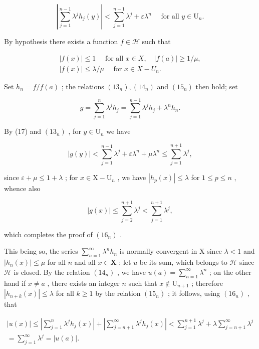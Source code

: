\[
\left| \sum_ {j = 1} ^ {n - 1} \lambda^ {j} h _ {j} (y) \right| <   \sum_ {j = 1} ^ {n - 1} \lambda^ {j} + \varepsilon \lambda^ {n} \quad \text { for   all } y \in \mathrm{U} _ {n}.\tag{17}
\]

By hypothesis there exists a function \(f \in \mathcal{H}\) such that

\[
\begin{array}{l} | f (x) | \leqslant 1 \quad \text { for   all } x \in X, \quad | f (a) | \geqslant 1 / \mu , \\ | f (x) | \leqslant \lambda / \mu \quad \text { for } x \in X - U _ {n}. \end{array}
\]

Set \(h_n = f / f(a)\) ; the relations \((13_n), (14_n)\) and \((15_n)\) then hold; set

\[
g = \sum_ {j = 1} ^ {n} \lambda^ {j} h _ {j} = \sum_ {j = 1} ^ {n - 1} \lambda^ {j} h _ {j} + \lambda^ {n} h _ {n}.
\]

By (17) and \((13_{n})\) , for \(y \in \mathrm{U}_n\) we have

\[
| g (y) | <   \sum_ {j = 1} ^ {n - 1} \lambda^ {j} + \varepsilon \lambda^ {n} + \mu \lambda^ {n} \leqslant \sum_ {j = 1} ^ {n + 1} \lambda^ {j},
\]

since \(\varepsilon + \mu \leqslant 1 + \lambda\) ; for \(x \in \mathrm{X} - \mathrm{U}_n\) , we have \(|h_p(x)| \leqslant \lambda\) for \(1 \leqslant p \leqslant n\) , whence also

\[
| g (x) | \leqslant \sum_ {j = 2} ^ {n + 1} \lambda^ {j} <   \sum_ {j = 1} ^ {n + 1} \lambda^ {j},
\]

which completes the proof of \((16_{n})\) .

This being so, the series \(\sum_{n=1}^{\infty} \lambda^n h_n\) is normally convergent in X since \(\lambda < 1\) and \(|h_n(x)| \leqslant \mu\) for all \(n\) and all \(x \in \mathbf{X}\) ; let \(u\) be its sum, which belongs to \(\mathcal{H}\) since \(\mathcal{H}\) is closed. By the relation \((14_n)\) , we have \(u(a) = \sum_{n=1}^{\infty} \lambda^n\) ; on the other hand if \(x \neq a\) , there exists an integer \(n\) such that \(x \notin \mathrm{U}_{n+1}\) ; therefore \(|h_{n+k}(x)| \leqslant \lambda\) for all \(k \geqslant 1\) by the relation \((15_n)\) ; it follows, using \((16_n)\) , that

\[
\begin{array}{l} | u (x) | \leqslant \left| \sum_ {j = 1} ^ {n} \lambda^ {j} h _ {j} (x) \right| + \left| \sum_ {j = n + 1} ^ {\infty} \lambda^ {j} h _ {j} (x) \right| <   \sum_ {j = 1} ^ {n + 1} \lambda^ {j} + \lambda \sum_ {j = n + 1} ^ {\infty} \lambda^ {j} \\ = \sum_ {j = 1} ^ {\infty} \lambda^ {j} = | u (a) |. \end{array}
\]

